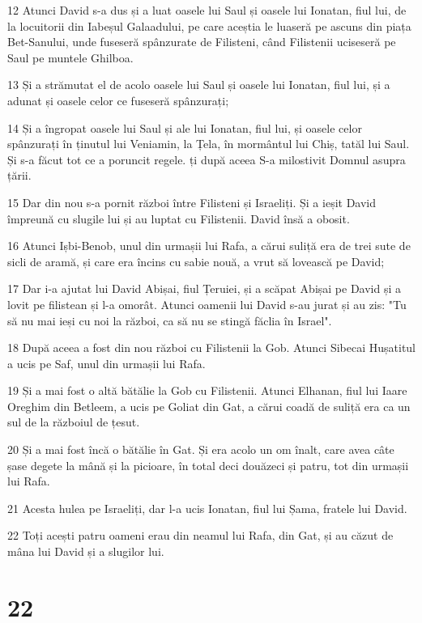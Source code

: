 \par 12 Atunci David s-a dus și a luat oasele lui Saul și oasele lui Ionatan, fiul lui, de la locuitorii din Iabeșul Galaadului, pe care aceștia le luaseră pe ascuns din piața Bet-Sanului, unde fuseseră spânzurate de Filisteni, când Filistenii uciseseră pe Saul pe muntele Ghilboa.
\par 13 Și a strămutat el de acolo oasele lui Saul și oasele lui Ionatan, fiul lui, și a adunat și oasele celor ce fuseseră spânzurați;
\par 14 Și a îngropat oasele lui Saul și ale lui Ionatan, fiul lui, și oasele celor spânzurați în ținutul lui Veniamin, la Țela, în mormântul lui Chiș, tatăl lui Saul. Și s-a făcut tot ce a poruncit regele. ți după aceea S-a milostivit Domnul asupra țării.
\par 15 Dar din nou s-a pornit război între Filisteni și Israeliți. Și a ieșit David împreună cu slugile lui și au luptat cu Filistenii. David însă a obosit.
\par 16 Atunci Ișbi-Benob, unul din urmașii lui Rafa, a cărui suliță era de trei sute de sicli de aramă, și care era încins cu sabie nouă, a vrut să lovească pe David;
\par 17 Dar i-a ajutat lui David Abișai, fiul Țeruiei, și a scăpat Abișai pe David și a lovit pe filistean și l-a omorât. Atunci oamenii lui David s-au jurat și au zis: "Tu să nu mai ieși cu noi la război, ca să nu se stingă făclia în Israel".
\par 18 După aceea a fost din nou război cu Filistenii la Gob. Atunci Sibecai Hușatitul a ucis pe Saf, unul din urmașii lui Rafa.
\par 19 Și a mai fost o altă bătălie la Gob cu Filistenii. Atunci Elhanan, fiul lui Iaare Oreghim din Betleem, a ucis pe Goliat din Gat, a cărui coadă de suliță era ca un sul de la războiul de țesut.
\par 20 Și a mai fost încă o bătălie în Gat. Și era acolo un om înalt, care avea câte șase degete la mână și la picioare, în total deci douăzeci și patru, tot din urmașii lui Rafa.
\par 21 Acesta hulea pe Israeliți, dar l-a ucis Ionatan, fiul lui Șama, fratele lui David.
\par 22 Toți acești patru oameni erau din neamul lui Rafa, din Gat, și au căzut de mâna lui David și a slugilor lui.

\chapter{22}

